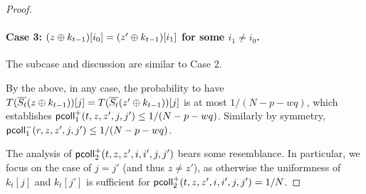 \begin{proof}
	
	
	
	\paragraph{Case 3: $(z\oplus k_{t-1})[i_0]=(z'\oplus k_{t-1})[i_1]$ for some $i_1\neq i_0$.}
	
	The subcase and discussion are similar to Case 2.
	
	
	
	\arrangespace
	
	
	By the above, in any case, the probability to have $T(\overline{S_t}(z\oplus k_{t-1}))[j]=T(\overline{S_t}(z'\oplus k_{t-1}))[j]$ is at most $1/(N-p-wq)$, which establishes $\mathsf{pcoll}_{1}^+(t,z,z',j,j')\leq1/(N-p-wq)$. Similarly by symmetry, $\mathsf{pcoll}_{1}^-(r,z,z',j,j')\leq1/(N-p-wq)$.
	
	
	
	
	\arrangespace
	
	
	The analysis of $\mathsf{pcoll}_{2}^+(t,z,z',i,i',j,j')$ bears some resemblance. In particular, we focus on the case of $j=j'$ (and thus $z\neq z'$), as otherwise the uniformness of $k_t[j]$ and $k_t[j']$ is sufficient for $\mathsf{pcoll}_{2}^+(t,z,z',i,i',j,j')=1/N$.
	

\end{proof}

